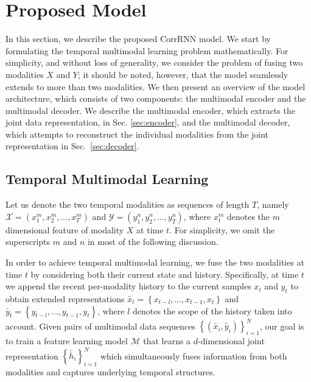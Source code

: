 \documentclass[10pt,twocolumn,letterpaper]{article}
\begin{document}
\section{Proposed Model}
\label{sec:model}
In this section, we describe the proposed CorrRNN model. We start by formulating the temporal multimodal learning problem mathematically. For simplicity, and without loss of generality, we consider the problem of fusing two modalities $X$ and $Y$; it should be noted, however, that the model seamlessly extends to more than two modalities. We then present an overview of the model architecture, which consists of two components: the multimodal encoder and the multimodal decoder. We describe the multimodal encoder, which extracts the joint data representation, in Sec. \ref{sec:encoder}, and the multimodal decoder, which attempts to reconstruct the individual modalities from the joint representation in Sec.~\ref{sec:decoder}.

\subsection{Temporal Multimodal Learning}
Let us denote the two temporal modalities as sequences of length $T$, namely $\mathcal{X}=(x_1^{m},x_2^{m},...,x_T^{m})$ and $\mathcal{Y}=(y_1^{n},y_2^{n},...,y_T^{n})$, where $x_t^{m}$ denotes the $m$ dimensional feature of modality $X$ at time $t$. For simplicity, we omit the superscripts $m$ and $n$ in most of the following discussion.

In order to achieve temporal multimodal learning, we fuse the two modalities at time $t$ by considering both their current state and history. Specifically, at time $t$ we append the recent per-modality history to the current samples $x_t$ and $y_t$ to obtain extended representations $\tilde{x_t}=\left \{x_{t-l},...,x_{t-1},x_{t} \right\}$ and $\tilde{y_t}=\left \{y_{t-l},...,y_{t-1},y_{t} \right\}$, where $l$ denotes the scope of the history taken into account. Given pairs of multimodal data sequences $\left\{ \left( \tilde{x_i}, \tilde{y_i} \right) \right\}_{i=1}^N$, our goal is to train a feature learning model $\mathcal{M}$ that learns a $d$-dimensional joint representation $\left\{ \tilde{h_i} \right\}_{i=1}^N$ which simultaneously fuses information from both modalities and captures underlying temporal structures.
\end{document}
